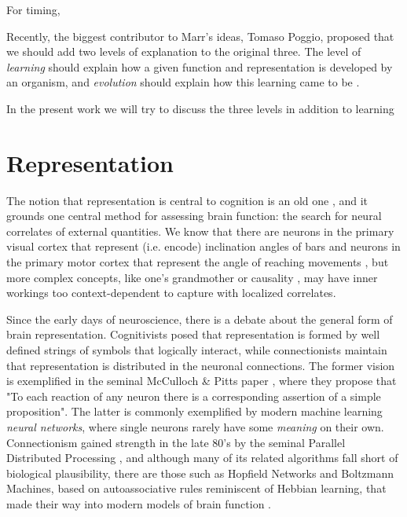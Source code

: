         For timing, 
        
        Recently, the biggest contributor to Marr's ideas, Tomaso Poggio, proposed that we should add two levels of explanation to the original three. The level of \textit{learning} should explain how a given function and representation is developed by an organism, and \textit{evolution} should explain how this learning came to be \cite{poggio2012levels}. 
        
        In the present work we will try to discuss the three levels in addition to learning
        
\section{Representation}
\label{sec:representation}
    The notion that representation is central to cognition is an old one \cite[p.~134-140]{rosch1991embodied}, and it grounds one central method for assessing brain function: the search for neural correlates of external quantities. We know that there are neurons in the primary visual cortex that represent (i.e. encode) inclination angles of bars \cite[p.~13]{dayan2001theoretical} and neurons in the primary motor cortex that represent the angle of reaching movements \cite[p.~14]{dayan2001theoretical}, but more complex concepts, like one's grandmother \cite{} or causality \cite{}, may have inner workings too context-dependent to capture with localized correlates. 
    
    Since the early days of neuroscience, there is a debate about the general form of brain representation. Cognitivists posed that representation is formed by well defined strings of symbols that logically interact, while connectionists maintain that representation is distributed in the neuronal connections. The former vision is exemplified in the seminal McCulloch \& Pitts paper \cite{mcculloch1943logical}, where they propose that "To each reaction of any neuron there is a corresponding assertion of a simple proposition". The latter is commonly exemplified by modern machine learning \textit{neural networks}, where single neurons rarely have some \textit{meaning} on their own. Connectionism gained strength in the late 80's by the seminal Parallel Distributed Processing \cite{mcclelland1986parallel}, and although many of its related algorithms fall short of biological plausibility, there are those such as Hopfield Networks and Boltzmann Machines, based on autoassociative rules reminiscent of Hebbian learning, that made their way into modern models of brain function \cite{}. 
    
